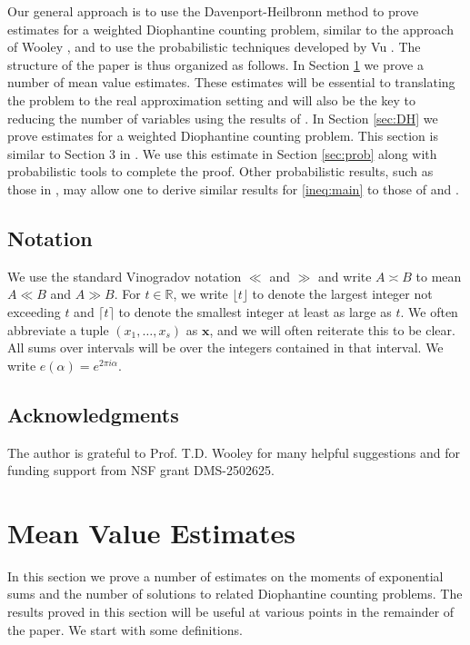 \documentclass[11pt,reqno]{amsart}
\numberwithin{equation}{section}
\begin{document}
Our general approach is to use the Davenport-Heilbronn method to prove estimates for a weighted Diophantine counting problem, similar to the approach of Wooley \cite{WoolThin}, and to use the probabilistic techniques developed by Vu \cite{VuRef}. The structure of the paper is thus organized as follows. In Section \ref{sec:meanval} we prove a number of mean value estimates. These estimates will be essential to translating the problem to the real approximation setting and will also be the key to reducing the number of variables using the results of \cite{BharMVE}. In Section \ref{sec:DH} we prove estimates for a weighted Diophantine counting problem. This section is similar to Section 3 in \cite{WoolThin}. We use this estimate in Section \ref{sec:prob} along with probabilistic tools to complete the proof. Other probabilistic results, such as those in \cite{JanRuc}, may allow one to derive similar results for \eqref{ineq:main} to those of \cite{pliegoVu} and \cite{taf26}. 

\subsection{Notation}
We use the standard Vinogradov notation $\ll $ and $\gg$ and write $A \asymp B$ to mean $A \ll B$ and $A \gg B$. For $t \in \mathbb{R}$, we write $\lfloor t \rfloor$ to denote the largest integer not exceeding $t$ and $\lceil t \rceil$ to denote the smallest integer at least as large as $t$. We often abbreviate a tuple $(x_1,\ldots,x_s)$ as $\mathbf{x}$, and we will often reiterate this to be clear. All sums over intervals will be over the integers contained in that interval. We write $e(\alpha)=e^{2\pi i\alpha}$. 

\subsection{Acknowledgments} The author is grateful to Prof. T.D. Wooley for many helpful suggestions and for funding support from NSF grant DMS-2502625. 


\section{Mean Value Estimates} \label{sec:meanval}
In this section we prove a number of estimates on the moments of exponential sums and the number of solutions to related Diophantine counting problems. The results proved in this section will be useful at various points in the remainder of the paper. We start with some definitions. 
\end{document}
